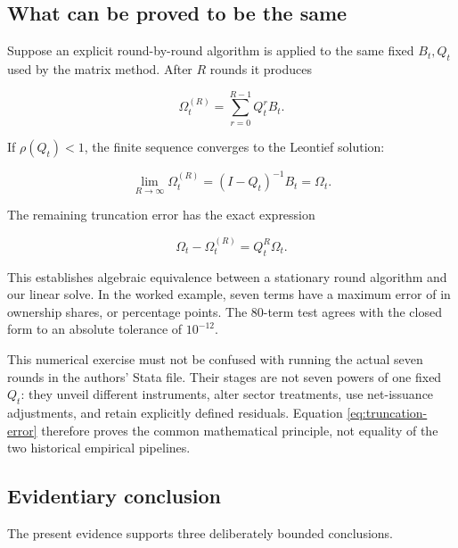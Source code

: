 \documentclass[11pt]{article}
\begin{document}
\subsection{What can be proved to be the same}

Suppose an explicit round-by-round algorithm is applied to the same fixed
$B_t,Q_t$ used by the matrix method. After $R$ rounds it produces

\begin{equation}
  \Omega_t^{(R)}=\sum_{r=0}^{R-1}Q_t^rB_t.
\end{equation}

If $\rho(Q_t)<1$, the finite sequence converges to the Leontief solution:

\begin{equation}
  \lim_{R\rightarrow\infty}\Omega_t^{(R)}
  =(I-Q_t)^{-1}B_t=\Omega_t.
\end{equation}

The remaining truncation error has the exact expression

\begin{equation}
  \Omega_t-\Omega_t^{(R)}=Q_t^R\Omega_t.
  \label{eq:truncation-error}
\end{equation}

This establishes algebraic equivalence between a stationary round algorithm
and our linear solve. In the worked example, seven terms have a maximum error
of \ToyMaxSevenRoundGap{} in ownership shares, or
\ToyMaxSevenRoundGapPP{} percentage points. The 80-term test agrees with the
closed form to an absolute tolerance of $10^{-12}$.

This numerical exercise must not be confused with running the actual seven
rounds in the authors' Stata file. Their stages are not seven powers of one
fixed $Q_t$: they unveil different instruments, alter sector treatments, use
net-issuance adjustments, and retain explicitly defined residuals. Equation
\eqref{eq:truncation-error} therefore proves the common mathematical principle,
not equality of the two historical empirical pipelines.

\subsection{Evidentiary conclusion}

The present evidence supports three deliberately bounded conclusions.
\end{document}
